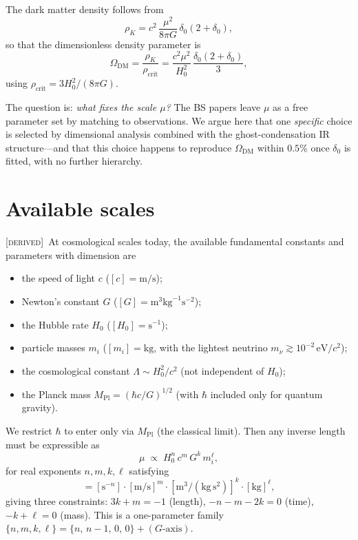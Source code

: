 \documentclass[prd,twocolumn,superscriptaddress,longbibliography,floatfix]{revtex4-2}
\newcommand{\Hzero}{H_{0}}
\newcommand{\rhocrit}{\rho_{\mathrm{crit}}}
\newcommand{\OmegaDM}{\Omega_{\mathrm{DM}}}
\newcommand{\MPl}{M_{\mathrm{Pl}}}
\newcommand{\derived}{\textsc{[derived]}}
\begin{document}
The dark matter density follows from
\begin{equation}
\rho_{K} = c^{2}\,\frac{\mu^{2}}{8\pi G}\,\delta_{0}(2+\delta_{0}),
\label{eq:rhoK}
\end{equation}
so that the dimensionless density parameter is
\begin{equation}
\OmegaDM = \frac{\rho_{K}}{\rhocrit}
= \frac{c^{2}\mu^{2}}{\Hzero^{2}}\,
\frac{\delta_{0}(2+\delta_{0})}{3},
\label{eq:OmegaDM_general}
\end{equation}
using $\rhocrit = 3\Hzero^{2}/(8\pi G)$.

The question is: \emph{what fixes the scale $\mu$?}
The BS papers leave $\mu$ as a free parameter set by
matching to observations.  We argue here that one
\emph{specific} choice is selected by dimensional analysis
combined with the ghost-condensation IR structure---and
that this choice happens to reproduce $\OmegaDM$ within
$0.5\%$ once $\delta_{0}$ is fitted, with no further
hierarchy.

\section{Available scales}
\label{sec:scales}

\derived\ At cosmological scales today, the available
fundamental constants and parameters with dimension are
\begin{itemize}
\item the speed of light $c$
  ($[c] = \mathrm{m/s}$);
\item Newton's constant $G$
  ($[G] = \mathrm{m}^{3}\mathrm{kg}^{-1}\mathrm{s}^{-2}$);
\item the Hubble rate $\Hzero$
  ($[\Hzero] = \mathrm{s}^{-1}$);
\item particle masses $m_{i}$
  ($[m_{i}] = \mathrm{kg}$, with the lightest neutrino
  $m_{\nu} \gtrsim 10^{-2}\,\mathrm{eV}/c^{2}$);
\item the cosmological constant
  $\Lambda \sim \Hzero^{2}/c^{2}$
  (not independent of $\Hzero$);
\item the Planck mass
  $\MPl = (\hbar c/G)^{1/2}$ (with $\hbar$ included only
  for quantum gravity).
\end{itemize}

We restrict $\hbar$ to enter only via $\MPl$ (the
classical limit).  Then any inverse length must be
expressible as
\begin{equation}
\mu \;\propto\; \Hzero^{n}\,c^{m}\,G^{k}\,m_{i}^{\ell},
\label{eq:mu_ansatz}
\end{equation}
for real exponents $n,m,k,\ell$ satisfying
\begin{equation}
[\mathrm{m}^{-1}]
= [\mathrm{s}^{-n}]\cdot[\mathrm{m/s}]^{m}\cdot
  [\mathrm{m}^{3}/(\mathrm{kg}\,\mathrm{s}^{2})]^{k}\cdot
  [\mathrm{kg}]^{\ell},
\label{eq:dimcount}
\end{equation}
giving three constraints:
$3k + m = -1$ (length),
$-n - m - 2k = 0$ (time),
$-k + \ell = 0$ (mass).
This is a one-parameter family
$\{n,m,k,\ell\} = \{n,\,n-1,\,0,\,0\} + (\text{$G$-axis})$.
\end{document}
